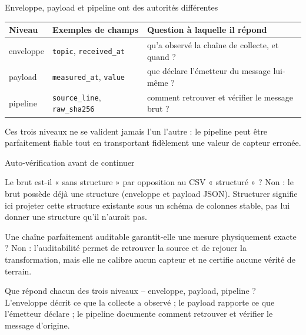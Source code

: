 \documentclass[aspectratio=169]{beamer}
\begin{document}
\begin{frame}{Enveloppe, payload et pipeline ont des autorités différentes}
\small
\begin{tabular}{@{}p{}p{}p{}@{}}
\toprule
Niveau & Exemples de champs & Question à laquelle il répond \\
\midrule
enveloppe & \texttt{topic}, \texttt{received\_at} & qu'a observé la chaîne de collecte, et quand ? \\[2pt]
payload & \texttt{measured\_at}, \texttt{value} & que déclare l'émetteur du message lui-même ? \\[2pt]
pipeline & \texttt{source\_line}, \texttt{raw\_sha256} & comment retrouver et vérifier le message brut ? \\
\bottomrule
\end{tabular}
\vfill
\normalsize Ces trois niveaux ne se valident jamais l'un l'autre : le pipeline peut être parfaitement fiable tout en transportant fidèlement une valeur de capteur erronée.
\end{frame}

\begin{frame}{Auto-vérification avant de continuer}
\small
\begin{block}{Le brut est-il « sans structure » par opposition au CSV « structuré » ?}
Non : le brut possède déjà une structure (enveloppe et payload JSON). Structurer signifie ici projeter cette structure existante sous un schéma de colonnes stable, pas lui donner une structure qu'il n'aurait pas.
\end{block}
\begin{block}{Une chaîne parfaitement auditable garantit-elle une mesure physiquement exacte ?}
Non : l'auditabilité permet de retrouver la source et de rejouer la transformation, mais elle ne calibre aucun capteur et ne certifie aucune vérité de terrain.
\end{block}
\begin{block}{Que répond chacun des trois niveaux -- enveloppe, payload, pipeline ?}
L'enveloppe décrit ce que la collecte a observé ; le payload rapporte ce que l'émetteur déclare ; le pipeline documente comment retrouver et vérifier le message d'origine.
\end{block}
\end{frame}
\end{document}
